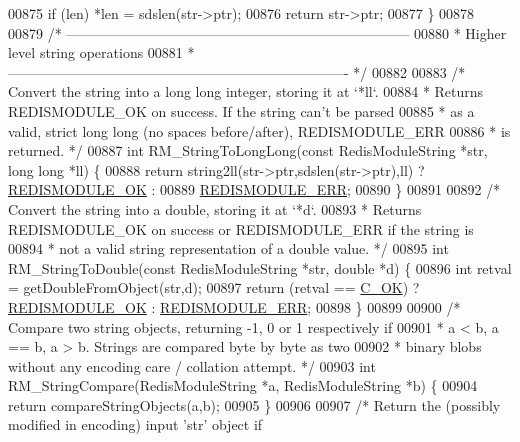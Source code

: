 \begin{DoxyCode}
{00875     \textcolor{keywordflow}{if} (len) *len = sdslen(str->ptr);
00876     \textcolor{keywordflow}{return} str->ptr;
00877 \}
00878 
00879 \textcolor{comment}{/* --------------------------------------------------------------------------}
00880 \textcolor{comment}{ * Higher level string operations}
00881 \textcolor{comment}{ * ------------------------------------------------------------------------- */}
00882 
00883 \textcolor{comment}{/* Convert the string into a long long integer, storing it at `*ll`.}
00884 \textcolor{comment}{ * Returns REDISMODULE\_OK on success. If the string can't be parsed}
00885 \textcolor{comment}{ * as a valid, strict long long (no spaces before/after), REDISMODULE\_ERR}
00886 \textcolor{comment}{ * is returned. */}
00887 \textcolor{keywordtype}{int} RM\_StringToLongLong(\textcolor{keyword}{const} RedisModuleString *str, \textcolor{keywordtype}{long} \textcolor{keywordtype}{long} *ll) \{
00888     \textcolor{keywordflow}{return} string2ll(str->ptr,sdslen(str->ptr),ll) ? \hyperlink{redismodule_8h_a1bc5bfd69abcd378ff52c640adc5418d}{REDISMODULE\_OK} :
00889                                                      \hyperlink{redismodule_8h_a3df6f5bd5247289e66f44437a7cddd49}{REDISMODULE\_ERR};
00890 \}
00891 
00892 \textcolor{comment}{/* Convert the string into a double, storing it at `*d`.}
00893 \textcolor{comment}{ * Returns REDISMODULE\_OK on success or REDISMODULE\_ERR if the string is}
00894 \textcolor{comment}{ * not a valid string representation of a double value. */}
00895 \textcolor{keywordtype}{int} RM\_StringToDouble(\textcolor{keyword}{const} RedisModuleString *str, \textcolor{keywordtype}{double} *d) \{
00896     \textcolor{keywordtype}{int} retval = getDoubleFromObject(str,d);
00897     \textcolor{keywordflow}{return} (retval == \hyperlink{server_8h_a303769ef1065076e68731584e758d3e1}{C\_OK}) ? \hyperlink{redismodule_8h_a1bc5bfd69abcd378ff52c640adc5418d}{REDISMODULE\_OK} : 
      \hyperlink{redismodule_8h_a3df6f5bd5247289e66f44437a7cddd49}{REDISMODULE\_ERR};
00898 \}
00899 
00900 \textcolor{comment}{/* Compare two string objects, returning -1, 0 or 1 respectively if}
00901 \textcolor{comment}{ * a < b, a == b, a > b. Strings are compared byte by byte as two}
00902 \textcolor{comment}{ * binary blobs without any encoding care / collation attempt. */}
00903 \textcolor{keywordtype}{int} RM\_StringCompare(RedisModuleString *a, RedisModuleString *b) \{
00904     \textcolor{keywordflow}{return} compareStringObjects(a,b);
00905 \}
00906 
00907 \textcolor{comment}{/* Return the (possibly modified in encoding) input 'str' object if}
}
\end{DoxyCode}
